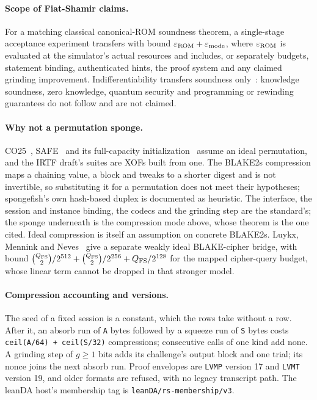 \paragraph{Scope of Fiat-Shamir claims.} For a matching classical canonical-ROM soundness theorem, a single-stage acceptance experiment transfers with bound $\varepsilon_{\mathrm{ROM}}+\varepsilon_{\mathrm{mode}}$, where $\varepsilon_{\mathrm{ROM}}$ is evaluated at the simulator's actual resources and includes, or separately budgets, statement binding, authenticated hints, the proof system and any claimed grinding improvement. Indifferentiability transfers soundness only~\cite[\S2.3]{CO25}: knowledge soundness, zero knowledge, quantum security and programming or rewinding guarantees do not follow and are not claimed.

\paragraph{Why not a permutation sponge.} CO25~\cite{CO25}, SAFE~\cite{SAFE23} and its full-capacity initialization~\cite[Theorem 2]{KMM23} assume an ideal permutation, and the IRTF draft's suites are XOFs built from one. The BLAKE2s compression maps a chaining value, a block and tweaks to a shorter digest and is not invertible, so substituting it for a permutation does not meet their hypotheses; spongefish's own hash-based duplex is documented as heuristic. The interface, the session and instance binding, the codecs and the grinding step are the standard's; the sponge underneath is the compression mode above, whose theorem is the one cited. Ideal compression is itself an assumption on concrete BLAKE2s. Luykx, Mennink and Neves~\cite[Theorem 1]{LMN16} give a separate weakly ideal BLAKE-cipher bridge, with bound $\binom{Q_{\mathrm{FS}}}{2}/2^{512}+\binom{Q_{\mathrm{FS}}}{2}/2^{256}+Q_{\mathrm{FS}}/2^{128}$ for the mapped cipher-query budget, whose linear term cannot be dropped in that stronger model.

\paragraph{Compression accounting and versions.} The seed of a fixed session is a constant, which the rows take without a row. After it, an absorb run of \texttt{A} bytes followed by a squeeze run of \texttt{S} bytes costs \texttt{ceil(A/64) + ceil(S/32)} compressions; consecutive calls of one kind add none. A grinding step of $g\ge1$ bits adds its challenge's output block and one trial; its nonce joins the next absorb run. Proof envelopes are \texttt{LVMP} version 17 and \texttt{LVMT} version 19, and older formats are refused, with no legacy transcript path. The leanDA host's membership tag is \texttt{leanDA/rs-membership/v3}.

